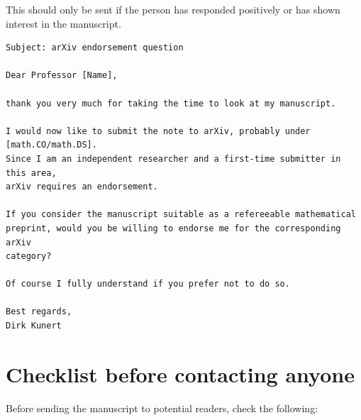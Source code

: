 \documentclass[11pt]{article}
\begin{document}
This should only be sent if the person has responded positively or has shown
interest in the manuscript.

\begin{verbatim}
Subject: arXiv endorsement question

Dear Professor [Name],

thank you very much for taking the time to look at my manuscript.

I would now like to submit the note to arXiv, probably under [math.CO/math.DS].
Since I am an independent researcher and a first-time submitter in this area,
arXiv requires an endorsement.

If you consider the manuscript suitable as a refereeable mathematical
preprint, would you be willing to endorse me for the corresponding arXiv
category?

Of course I fully understand if you prefer not to do so.

Best regards,
Dirk Kunert
\end{verbatim}

\section*{Checklist before contacting anyone}

Before sending the manuscript to potential readers, check the following:
\end{document}
